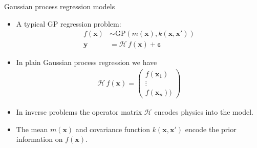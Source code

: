 \documentclass[first=dgreen,second=purple,presentation]{elecslides}
\begin{document}
\begin{frame}{Gaussian process regression models}

 \begin{itemize}[<+->]
 \item A typical \alert{GP regression problem}:
\begin{equation}
\begin{split}
  f(\mathbf{x}) &\sim \mathrm{GP}(m(\mathbf{x}),k(\mathbf{x},\mathbf{x}')) \\
  \mathbf{y} &= \boldsymbol{\mathcal{H}} \, f(\mathbf{x}) + \boldsymbol{\varepsilon} %
\end{split}
\nonumber
\end{equation}

\item In plain \alert{Gaussian process regression} we have
\begin{equation}
\begin{split}
\boldsymbol{\mathcal{H}} \, f(\mathbf{x}) = \begin{pmatrix}
  f(\mathbf{x}_1) \\ \vdots \\ f(\mathbf{x}_n))
  \end{pmatrix}
\end{split}
\nonumber
\end{equation}

\item In inverse problems the \alert{operator matrix} $\boldsymbol{\mathcal{H}}$ encodes \alert{physics} into the model.

\item The \alert{mean} $m(\mathbf{x})$ and \alert{covariance function} $k(\mathbf{x},\mathbf{x}')$ encode the prior information on $f(\mathbf{x})$.

 \end{itemize}

\end{frame}
\end{document}
